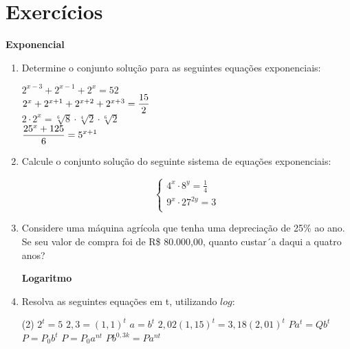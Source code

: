         \begin{texample}
        \centering
        \end{texample}
	
	\section{Exercícios}

    \noindent
	\textbf{Exponencial}
	\begin{enumerate}
		\item Determine o conjunto solução para as seguintes equações exponenciais:
		\begin{tasks}
			\task $2^{x-3} + 2^{x-1} + 2^{x} = 52 $ \\[-0.25cm]
			\task $2^{x} + 2^{x+1} + 2^{x+2} + 2^{x+3} = \displaystyle\frac{15}{2} $\\[-0.25cm]
			\task $ 2 \cdot 2^x = \sqrt[6]{8}  \cdot \sqrt[4]{2} \cdot \sqrt[6]{2}$ \\[-0.25cm]
			\task $\displaystyle\frac{25^x+125}{6} = 5^{x+1}$ \\[-0.25cm]
		\end{tasks}
		
		\item Calcule o conjunto solução do seguinte sistema de equações exponenciais:
		
		\[ \left\{  
		\begin{array}{c}
			4^x \cdot 8^y = \frac{1}{4}\\
			9^x \cdot 27^{2y} = 3 \\
		\end{array} 
		\right.
		\]
		
		\item Considere uma máquina agrícola que tenha uma depreciação de 25\% ao ano. Se seu valor de compra foi de R\$ 80.000,00, quanto custar´a daqui a quatro anos?
		
		\noindent
		\hspace{-1.1cm}\textbf{Logaritmo}
		
		\item  Resolva as seguintes equações em t, utilizando $log$:
		
		\begin{tasks}(2)
			\task $2^t=5$
			\task $2,3=(1,1)^t$
			\task $a=b^t$
			\task $2,02(1,15)^t =3,18(2,01)^t$
			\task $Pa^t=Qb^t$
			\task $P=P_{0}b^t$
			\task $P=P_{0}a^{nt}$
			\task $Pb^{0,3k}=Pa^{nt}$
		\end{tasks}
		

\end{enumerate}

